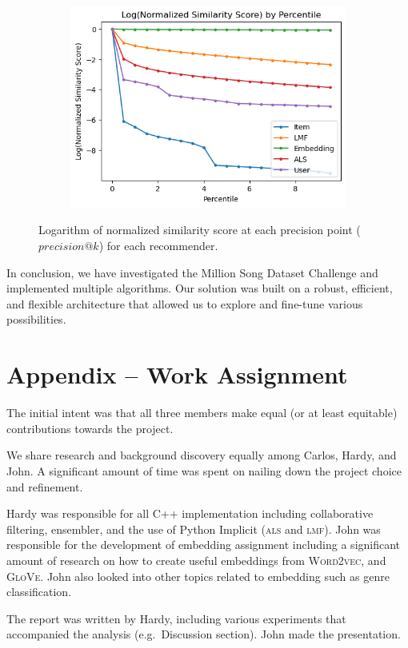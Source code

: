 \documentclass[conference]{IEEEtran}
\begin{document}
\begin{figure}[htbp]
\centering
\begin{subfigure}{0.85\columnwidth}
  \centering
  \includegraphics[width=\columnwidth]{similarity.png}
\end{subfigure}
\caption{Logarithm of normalized similarity score at each precision
point ($precision\textrm{@}k$) for each recommender.}
\label{fig:similarity}
\end{figure}

In conclusion, we have investigated the Million Song Dataset Challenge and
implemented multiple algorithms. Our solution was built on a robust, efficient,
and flexible architecture that allowed us to explore and fine-tune various
possibilities.

\section*{Appendix -- Work Assignment}

The initial intent was that all three members make equal
(or at least equitable) contributions towards the project.

We share research and background discovery equally
among Carlos, Hardy, and John.
A significant amount of time was spent on
nailing down the project choice and refinement.

Hardy was responsible for all C++ implementation including collaborative
filtering, ensembler, and the use of Python
Implicit (\textsc{als} and \textsc{lmf}). John was responsible
for the development of embedding assignment including a significant amount of
research on how to create useful embeddings from \textsc{Word2vec},
and \textsc{GloVe}. John also
looked into other topics related to embedding such as genre classification.

The report was written by Hardy, including various experiments that
accompanied the analysis (e.g.~Discussion section). John made the
presentation.



\end{document}
